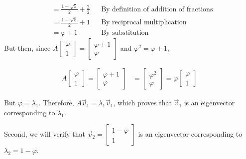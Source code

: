 \documentclass{article}
\newcommand{\reason}[1]{&& \text{#1}}
\begin{document}
\begin{enumerate}
\begin{align*}
                    & = \frac{1 + \sqrt{5}}{2} + \frac{2}{2} \reason{By definition of addition of fractions}        \\
                    & = \frac{1 + \sqrt{5}}{2} + 1 \reason{By reciprocal multiplication}                            \\
                    & = \varphi+1 \reason{By substitution}
        \end{align*}
        But then, since $A \begin{bmatrix}
            \varphi \\
            1
          \end{bmatrix} = \begin{bmatrix}
            \varphi +1 \\
            \varphi
          \end{bmatrix}$ and $\varphi^2 = \varphi+1$,

        \begin{align*}
          A \begin{bmatrix}
              \varphi \\
              1
            \end{bmatrix} = \begin{bmatrix}
                              \varphi+1 \\
                              \varphi
                            \end{bmatrix} & = \begin{bmatrix}
                                                \varphi^2 \\
                                                \varphi
                                              \end{bmatrix} = \varphi\begin{bmatrix}
                                                                       \varphi \\
                                                                       1
                                                                     \end{bmatrix}
        \end{align*}

        But $\varphi = \lambda_1$. Therefore, $A\vec{v}_1 = \lambda_1\vec{v}_1$, which proves that $\vec{v}_1$ is an eigenvector corresponding to $\lambda_1$.

        Second, we will verify that $\vec{v}_2 = \begin{bmatrix} 1 - \varphi \\ 1 \end{bmatrix}$ is an eigenvector corresponding to $\lambda_2 = 1 - \varphi$.


\end{enumerate}
\end{document}
